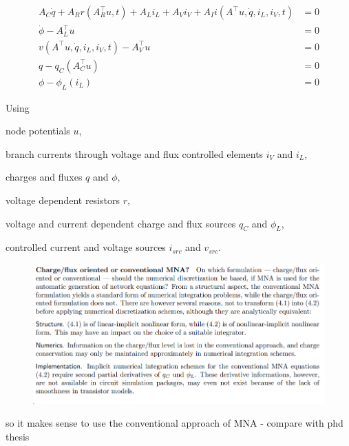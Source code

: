 \begin{align}
	A_C\dot{q} + A_R r(A_R^\top u,t) + A_L i_L + A_V i_V + A_I i(A^\top u, \dot{q}, i_L, i_V, t) &= 0 \label{charge/flux-1} \\
	\dot{\phi} - A_L^\top u &= 0 \label{charge/flux-2} \\
	v(A^\top u, \dot{q}, i_L, i_V, t) - A_V^\top u &= 0 \label{charge/flux-3} \\
	q - q_C(A_C^\top u) &= 0 \label{charge/flux-4} \\
	\phi - \phi_L(i_L) &= 0  \label{charge/flux-5} 
\end{align}

Using
\begin{description}
	\item node potentials $u$,
	\item branch currents through voltage and flux controlled elements $i_V$ and $i_L$,
	\item charges and fluxes $q$ and $\phi$,
	\item voltage dependent resistors $r$,
	\item voltage and current dependent charge and flux sources $q_C$ and $\phi_L$,
	\item controlled current and voltage sources $i_{src}$ and $v_{src}$.
\end{description} 

\begin{figure}[H]
	\centering
	\includegraphics[width=0.7\linewidth]{screenshot007}
	\caption{}
	\label{fig:screenshot007}
\end{figure}

so it makes sense to use the conventional approach of MNA - compare with phd thesis 